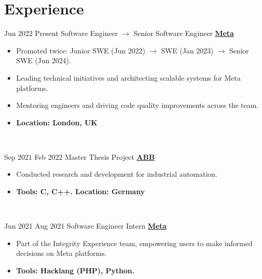 
\section{Experience}
\begin{twenty}
    \twentyitem
        {Jun 2022}
        {Present}
        {Software Engineer $\rightarrow$ Senior Software Engineer}
        {\large\textbf{\href{https://about.meta.com/}{Meta}}}
        {
            \begin{itemize}
                \item Promoted twice: Junior SWE (Jun 2022) $\rightarrow$ SWE (Jan 2023) $\rightarrow$ Senior SWE (Jun 2024).
                \item Leading technical initiatives and architecting scalable systems for Meta platforms.
                \item Mentoring engineers and driving code quality improvements across the team.
                \item \textbf{Location: London, UK}
            \end{itemize}
        }
        {\\}

    \twentyitem
        {Sep 2021}
        {Feb 2022}
        {Master Thesis Project}
        {\large\textbf{\href{https://www.abb.com/}{ABB}}}
        {
            \begin{itemize}
                \item Conducted research and development for industrial automation.
                \item \textbf{Tools: C, C++. Location: Germany}
            \end{itemize}
        }
        {\\}

    \twentyitem
        {Jun 2021}
        {Aug 2021}
        {Software Engineer Intern}
        {\large\textbf{\href{https://about.meta.com/}{Meta}}}
        {
            \begin{itemize}
                \item Part of the Integrity Experience team, empowering users to make informed decisions on Meta platforms.
                \item \textbf{Tools: Hacklang (PHP), Python.}
            \end{itemize}
        }
        {\\}


\end{twenty}
